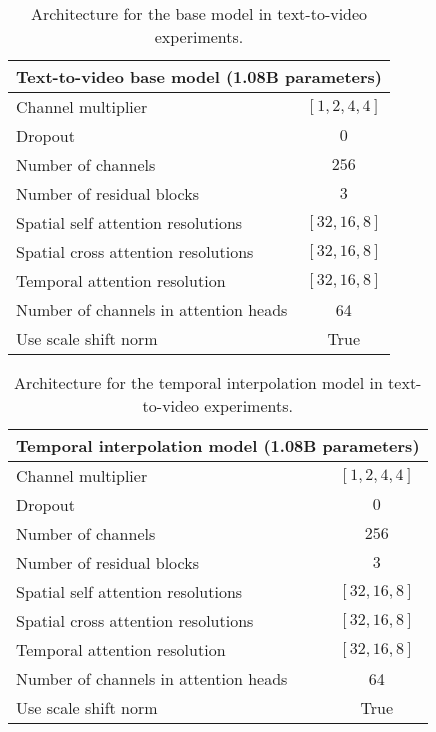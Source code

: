 \documentclass[10pt,twocolumn,letterpaper]{article}
\begin{document}
\vfill\null

\begin{table}[!ht]
    \centering
    \caption{Architecture for the base model in text-to-video experiments.}
    \vspace{-1mm}
    \label{tab:text2video_arch_base}
    \begin{tabular}{l c}
        \toprule
        \multicolumn{2}{c}{Text-to-video base model (1.08B parameters)}\\
        \midrule
        Channel multiplier & $[1, 2, 4, 4]$ \\
        Dropout & $0$ \\
        Number of channels & $256$ \\
        Number of residual blocks & $3$ \\
        Spatial self attention resolutions & $[32, 16, 8]$ \\
        Spatial cross attention resolutions & $[32, 16, 8]$ \\
        Temporal attention resolution & $[32, 16, 8]$ \\
        Number of channels in attention heads & 64\\
        Use scale shift norm & True \\
        \bottomrule
    \end{tabular}
\end{table}

\begin{table}[!ht]
    \centering
    \caption{Architecture for the temporal interpolation model in text-to-video experiments.}
    \vspace{-1mm}
    \label{tab:text2video_arch_ti}
    \begin{tabular}{l c}
        \toprule
        \multicolumn{2}{c}{Temporal interpolation model (1.08B parameters)}\\
        \midrule
        Channel multiplier & $[1, 2, 4, 4]$ \\
        Dropout & $0$ \\
        Number of channels & $256$ \\
        Number of residual blocks & $3$ \\
        Spatial self attention resolutions & $[32, 16, 8]$ \\
        Spatial cross attention resolutions & $[32, 16, 8]$ \\
        Temporal attention resolution & $[32, 16, 8]$ \\
        Number of channels in attention heads & 64\\
        Use scale shift norm & True \\
        \bottomrule
    \end{tabular}
\end{table}
\end{document}
